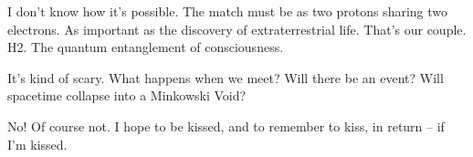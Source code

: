 

﻿I don't know how it's possible.  The match must be as two protons
sharing two electrons.  As important as the discovery of
extraterrestrial life.  That's our couple.  H2.  The quantum
entanglement of consciousness.


It's kind of scary.  What happens when we meet?  Will there be an
event?  Will spacetime collapse into a Minkowski Void?


No!  Of course not.  I hope to be kissed, and to remember to kiss, in
return -- if I'm kissed.

\bye
